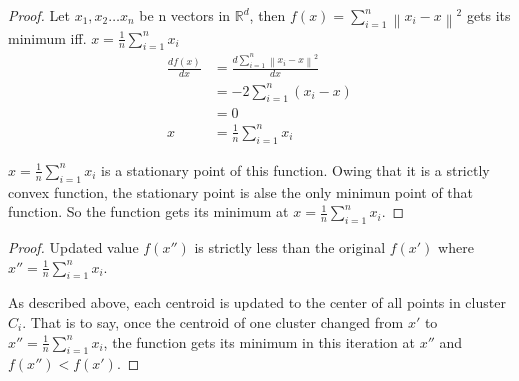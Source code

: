 \documentclass[11pt]{article}
\begin{document}
\begin{proof}
  Let $x_1, x_2 \dots x_n$ be n vectors in $\mathbb{R}^{d}$, then $f(x) = \sum_{i=1}^{n} {\left\lVert x_i - x\right\rVert}^2 $ gets its minimum iff. $x = \frac{1}{n} \sum_{i=1}^{n}x_i$
  \begin{equation*}
    \begin{split}
      \frac{d f(x)}{d x} &=  \frac{d \sum_{i=1}^{n} {\left\lVert x_i - x\right\rVert}^2}{d x} \\
      & = -2\sum_{i=1}^{n} (x_i - x) \\
      & = 0 \\
      x & = \frac{1}{n} \sum_{i=1}^{n}x_i
    \end{split}
  \end{equation*}
  
  \par $x = \frac{1}{n} \sum_{i=1}^{n}x_i$ is a stationary point of this function. Owing that it is a strictly convex function, the stationary point is alse the only minimun point of that function. 
  So the function gets its minimum at $x = \frac{1}{n} \sum_{i=1}^{n}x_i$.
  \end{proof}
  \begin{proof}
    Updated value $f(x'')$ is strictly less than the original $f(x')$ where  $x'' = \frac{1}{n} \sum_{i=1}^{n}x_i$.
  \par As described above, each centroid is updated to the center of all points in cluster $C_i$. 
  That is to say, once the centroid of one cluster changed from $x'$ to  $x'' = \frac{1}{n} \sum_{i=1}^{n}x_i$, the function gets its minimum in this iteration at $x''$ and $f(x'')<f(x')$.
  \end{proof}
\end{document}
